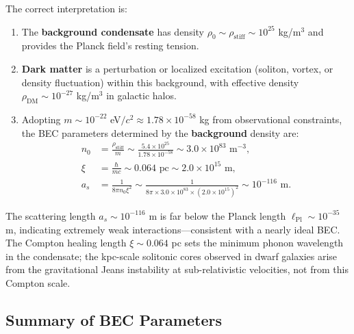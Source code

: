 \documentclass[11pt,a4paper]{article}
\newcommand{\lPl}{\ensuremath{\ell_{\mathrm{Pl}}}}
\newcommand{\rhostiff}{\ensuremath{\rho_{\mathrm{stiff}}}}
\theoremstyle{definition}
\theoremstyle{remark}
\begin{document}
The correct interpretation is:

\begin{enumerate}[leftmargin=*, itemsep=0.2em]
\item The \textbf{background condensate} has density $\rho_0 \sim \rhostiff \sim 10^{25}$ kg/m$^3$ and provides the Planck field's resting tension.

\item \textbf{Dark matter} is a perturbation or localized excitation (soliton, vortex, or density fluctuation) within this background, with effective density $\rho_{\mathrm{DM}} \sim 10^{-27}$ kg/m$^3$ in galactic halos.

\item Adopting $m \sim 10^{-22}$ eV$/c^2 \approx 1.78 \times 10^{-58}$ kg from observational constraints, the BEC parameters determined by the \textbf{background} density are:
\begin{align}
n_0 &= \frac{\rhostiff}{m} \sim \frac{5.4 \times 10^{25}}{1.78 \times 10^{-58}} \sim 3.0 \times 10^{83} \text{ m}^{-3}, \\
\xi &= \frac{\hbar}{mc} \sim 0.064 \text{ pc} \sim 2.0 \times 10^{15} \text{ m}, \\
a_s &= \frac{1}{8\pi n_0 \xi^2} \sim \frac{1}{8\pi \times 3.0 \times 10^{83} \times (2.0 \times 10^{15})^2} \sim 10^{-116} \text{ m}.
\end{align}
\end{enumerate}

The scattering length $a_s \sim 10^{-116}$ m is far below the Planck length $\lPl \sim 10^{-35}$ m, indicating extremely weak interactions---consistent with a nearly ideal BEC. The Compton healing length $\xi \sim 0.064$ pc sets the minimum phonon wavelength in the condensate; the kpc-scale solitonic cores observed in dwarf galaxies arise from the gravitational Jeans instability at sub-relativistic velocities, not from this Compton scale.

\subsection{Summary of BEC Parameters}
\label{sec:bec_params_summary}
\end{document}
